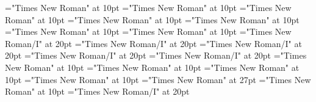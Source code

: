 \documentclass[a4paper]{article}
\begin{document}
 
\pagestyle{plain} 
\font\examplelastoftypearticledictionary="Times New Roman" at 10pt
\font\exampleuselastoftypearticledictionary="Times New Roman" at 10pt
\font\examplefirstoftypearticledictionary="Times New Roman" at 10pt
\font\exampleusefirstoftypearticledictionary="Times New Roman" at 10pt
\font\firstoftypelastoftypenotearticledictionary="Times New Roman" at 10pt
\font{}="Times New Roman" at 10pt
\font\firstoftypegrammarcategorylastoftypearticledictionary="Times New Roman" at 10pt
\font\lastoftypepronunciationenUKarticledictionary="Times New Roman/I" at 20pt
\font\pronunciationpronunciationbeforearticledictionary="Times New Roman/I" at 20pt
\font\lastoftypepronunciationenUSarticledictionary="Times New Roman/I" at 20pt
\font\pronunciationenUKpronunciationbeforearticledictionary="Times New Roman/I" at 20pt
\font\firstoftypepronunciationenUKarticledictionary="Times New Roman/I" at 20pt
\font\firstoftypelastoftyperelationsynonymarticledictionary="Times New Roman" at 10pt
\font\firstoftypegrammarrequireslastoftypearticledictionary="Times New Roman" at 10pt
\font\firstoftypeheadwordlastoftypearticledictionary="Times New Roman" at 10pt
\font\articledictionary="Times New Roman" at 10pt
\font\headsectionletterdictionary="Times New Roman" at 27pt
\font\sectionletterdictionary="Times New Roman" at 10pt
\font\pronunciationenUKpronunciationbefore="Times New Roman/I" at 20pt

\pagestyle{fancy} 
\begin{center}
\end{center}

\pronunciationpronunciationbeforearticledictionary{, }
\end{document}
